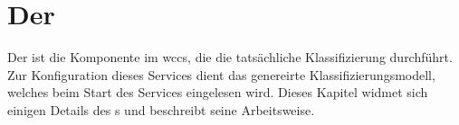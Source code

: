 \section{Der {\classificationService}}
    \label{section:solutionDetailsClassificationService}
    Der {\classificationService} ist die Komponente im \gls{wccs},
    die die tatsächliche Klassifizierung durchführt.
    Zur Konfiguration dieses Services dient das
    genereirte Klassifizierungsmodell,
    welches beim Start des Services eingelesen wird.
    Dieses Kapitel widmet sich einigen Details des {\classificationService}s
    und beschreibt seine Arbeitsweise.

    
    
    
